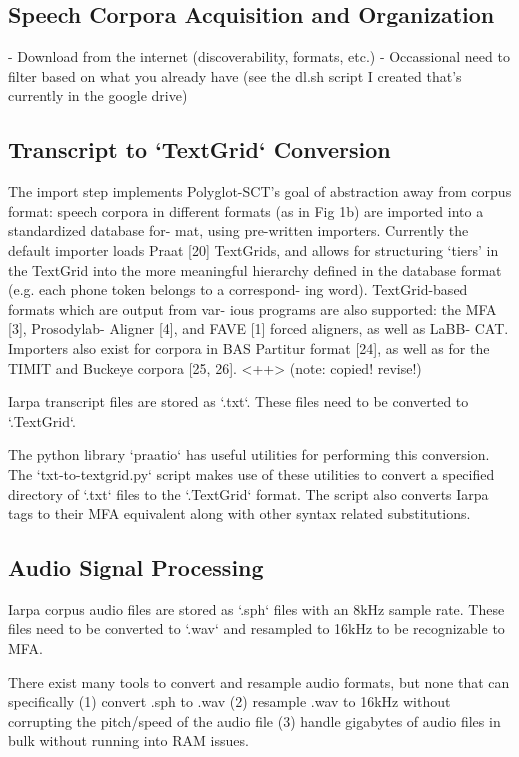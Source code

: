 \documentclass[11pt]{article}
\begin{document}
\subsection{Speech Corpora Acquisition and Organization}

- Download from the internet (discoverability, formats, etc.)
- Occassional need to filter based on what you already have (see the dl.sh script I created that's currently in the google drive)

\subsection{Transcript to `TextGrid` Conversion}

The import step implements Polyglot-SCT’s goal of abstraction
away from corpus format: speech corpora in different formats
(as in Fig 1b) are imported into a standardized database for-
mat, using pre-written importers. Currently the default importer
loads Praat [20] TextGrids, and allows for structuring ‘tiers’ in
the TextGrid into the more meaningful hierarchy defined in the
database format (e.g. each phone token belongs to a correspond-
ing word). TextGrid-based formats which are output from var-
ious programs are also supported: the MFA [3], Prosodylab-
Aligner [4], and FAVE [1] forced aligners, as well as LaBB-
CAT. Importers also exist for corpora in BAS Partitur format
[24], as well as for the TIMIT and Buckeye corpora [25, 26].
<++> (note: copied! revise!)

Iarpa transcript files are stored as `.txt`. These files need to be converted to `.TextGrid`.

The python library `praatio` has useful utilities for performing this conversion. The `txt-to-textgrid.py` script makes use of these utilities to convert a specified directory of `.txt` files to the `.TextGrid` format. The script also converts Iarpa tags to their MFA equivalent along with other syntax related substitutions.


\subsection{Audio Signal Processing}

Iarpa corpus audio files are stored as `.sph` files with an 8kHz sample rate. These files need to be converted to `.wav` and resampled to 16kHz to be recognizable to MFA.

There exist many tools to convert and resample audio formats, but none that can specifically (1) convert .sph to .wav (2) resample .wav to 16kHz without corrupting the pitch/speed of the audio file (3) handle gigabytes of audio files in bulk without running into RAM issues.
\end{document}
